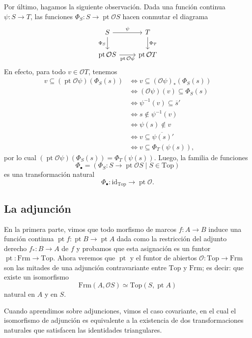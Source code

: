\documentclass[12pt,letterpaper,titlepage]{article}
\theoremstyle{definition}
\newcommand\ol[1]{\overline{#1}}
\renewcommand\cal[1]{\mathcal{#1}}
\newcommand\<{\langle}
\renewcommand\>{\rangle}
\newcommand{\Frm}{\mathrm{Frm}}
\newcommand{\Top}{\mathrm{Top}}
\newcommand{\id}{\mathrm{id}}
\DeclareMathOperator{\pt}{pt}
\begin{document}
Por último, hagamos la siguiente observación.
Dada una función continua $\psi:S\to T$,
las funciones $\Phi_S:S\to\pt\cal OS$ hacen conmutar el diagrama
\[
    \begin{tikzcd}
        S \ar[r,"\psi"] \ar[d,"\Phi_S"'] & T \ar[d,"\Phi_T"] \\
        \pt\cal OS \ar[r,"\pt\cal O\psi"'] & \pt\cal OT
    \end{tikzcd}
\]
En efecto, para todo $v\in\cal OT$, tenemos
\begin{align*}
    v\subseteq (\pt\cal O\psi)(\Phi_S(s))
    &\iff v\subseteq (\cal O\psi)_*(\Phi_S(s)) \\
    &\iff (\cal O\psi)(v) \subseteq \Phi_S(s) \\
    &\iff \psi^{-1}(v) \subseteq \ol{s}' \\
    &\iff s\nin \psi^{-1}(v) \\
    &\iff \psi(s)\nin v \\
    &\iff v\subseteq \ol{\psi(s)}' \\
    &\iff v\subseteq \Phi_T(\psi(s)),
\end{align*}
por lo cual $(\pt\cal O\psi)(\Phi_S(s))=\Phi_T(\psi(s))$.
Luego, la familia de funciones
\[
    \Phi_\bullet=(\Phi_S:S\to\pt\cal OS\mid S\in \Top)
\]
es una transformación natural
\[
    \Phi_\bullet : \id_\Top\to\pt\cal O
.\]

\subsection{La adjunción}
    \label{ssec:adjuncion}
En la primera parte, vimos que todo morfismo de marcos
$f:A\to B$ induce una función continua $\pt f:\pt B\to\pt A$ dada
como la restricción del adjunto derecho $f_*:B\to A$ de $f$ y
probamos que esta asignación es un funtor $\pt:\Frm\to\Top$.
Ahora veremos que $\pt$ y el funtor de abiertos
$\cal O:\Top\to\Frm$ son las mitades de una adjunción contravariante
entre $\Top$ y $\Frm$; es decir: que existe un isomorfismo
\begin{equation}
    \label{eqn:adj_frm_top}
    \Frm(A,\cal OS) \simeq \Top(S,\pt A)
\end{equation}
natural en $A$ y en $S$.

Cuando aprendimos sobre adjunciones,
vimos el caso covariante, en el cual el isomorfismo de
adjunción es equivalente a la existencia de dos transformaciones
naturales que satisfacen las identidades triangulares.
\end{document}
